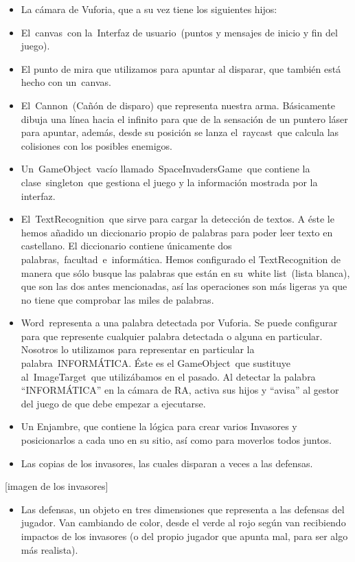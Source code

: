 \begin{itemize}
\item
  La cámara de Vuforia, que a su vez tiene los siguientes hijos:
\item
  El~canvas~con la~Interfaz de usuario~(puntos y mensajes de inicio y
  fin del juego).
\item
  El punto de mira que utilizamos para apuntar al disparar, que también
  está hecho con un~canvas.
\item
  El~Cannon~(Cañón de disparo) que representa nuestra arma. Básicamente
  dibuja una línea hacia el infinito para que de la sensación de un
  puntero láser para apuntar, además, desde su posición se lanza
  el~raycast~que calcula las colisiones con los posibles enemigos.
\item
  Un~GameObject~vacío llamado~SpaceInvadersGame~que contiene la
  clase~singleton~que gestiona el juego y la información mostrada por la
  interfaz.
\item
  El~TextRecognition~que sirve para cargar la detección de textos. A
  éste le hemos añadido un diccionario propio de palabras para poder
  leer texto en castellano. El diccionario contiene únicamente dos
  palabras,~facultad~e~informática. Hemos configurado el TextRecognition
  de manera que sólo busque las palabras que están en su~white
  list~(lista blanca), que son las dos antes mencionadas, así las
  operaciones son más ligeras ya que no tiene que comprobar las miles de
  palabras.
\item
  Word~representa a una palabra detectada por Vuforia. Se puede
  configurar para que represente cualquier palabra detectada o alguna en
  particular. Nosotros lo utilizamos para representar en particular la
  palabra~INFORMÁTICA. Éste es el GameObject~que sustituye
  al~ImageTarget~que utilizábamos en el pasado. Al detectar la palabra
  ``INFORMÁTICA'' en la cámara de RA, activa sus hijos y ``avisa'' al
  gestor del juego de que debe empezar a ejecutarse.
\item
  Un Enjambre, que contiene la lógica para crear varios Invasores y
  posicionarlos a cada uno en su sitio, así como para moverlos todos
  juntos.
\item
  Las copias de los invasores, las cuales disparan a veces a las
  defensas.
\end{itemize}

{[}imagen de los invasores{]}

\begin{itemize}
\itemsep1pt\parskip0pt
\item
  Las defensas, un objeto en tres dimensiones que representa a las
  defensas del jugador. Van cambiando de color, desde el verde al rojo
  según van recibiendo impactos de los invasores (o del propio jugador
  que apunta mal, para ser algo más realista).~~~~~~~~
\end{itemize}

